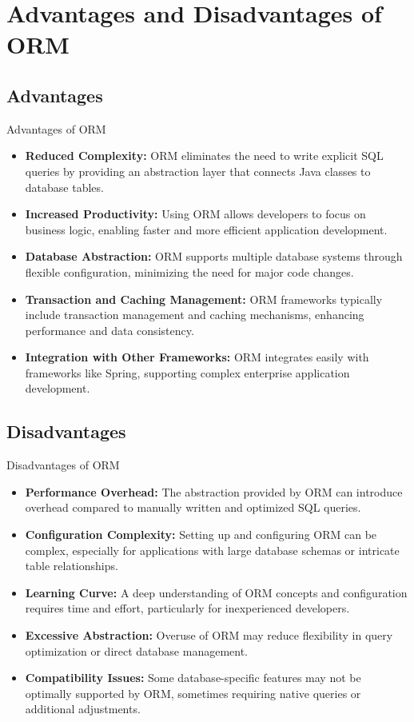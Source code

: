\documentclass[aspectratio=169, table]{beamer}
\begin{document}
\section{Advantages and Disadvantages of ORM}

\subsection{Advantages}
\begin{frame}{Advantages of ORM}
	\vspace{20pt}
	\begin{itemize}
		\item \textbf{Reduced Complexity:} ORM eliminates the need to write explicit SQL queries by providing an abstraction layer that connects Java classes to database tables.
		\item \textbf{Increased Productivity:} Using ORM allows developers to focus on business logic, enabling faster and more efficient application development.
		\item \textbf{Database Abstraction:} ORM supports multiple database systems through flexible configuration, minimizing the need for major code changes.
		\item \textbf{Transaction and Caching Management:} ORM frameworks typically include transaction management and caching mechanisms, enhancing performance and data consistency.
		\item \textbf{Integration with Other Frameworks:} ORM integrates easily with frameworks like Spring, supporting complex enterprise application development.
	\end{itemize}
\end{frame}

\subsection{Disadvantages}
\begin{frame}{Disadvantages of ORM}
	\vspace{20pt}
	\begin{itemize}
		\item \textbf{Performance Overhead:} The abstraction provided by ORM can introduce overhead compared to manually written and optimized SQL queries.
		\item \textbf{Configuration Complexity:} Setting up and configuring ORM can be complex, especially for applications with large database schemas or intricate table relationships.
		\item \textbf{Learning Curve:} A deep understanding of ORM concepts and configuration requires time and effort, particularly for inexperienced developers.
		\item \textbf{Excessive Abstraction:} Overuse of ORM may reduce flexibility in query optimization or direct database management.
		\item \textbf{Compatibility Issues:} Some database-specific features may not be optimally supported by ORM, sometimes requiring native queries or additional adjustments.
	\end{itemize}
\end{frame}
\end{document}
